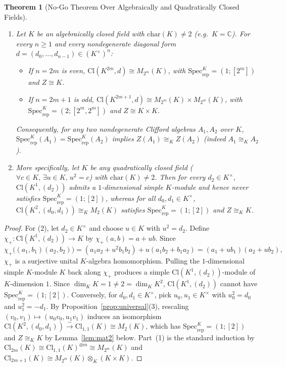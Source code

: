 \documentclass[11pt,a4paper]{article}
\theoremstyle{plain}
\newtheorem{theorem}{Theorem}[section]
\theoremstyle{definition}
\newcommand{\Cl}{\mathrm{Cl}}
\newcommand{\Specrep}{\mathrm{Spec}_{\mathrm{rep}}}
\newcommand{\Mat}{M}
\newcommand{\C}{\mathbb{C}}
\begin{document}
\begin{theorem}[No-Go Theorem Over Algebraically and Quadratically Closed Fields]\label{thm:obstruction}
\leavevmode
\begin{enumerate}
  \item Let $K$ be an algebraically closed field with $\mathrm{char}(K) \neq 2$ (e.g.\ $K = \C$). For every $n \ge 1$ and every nondegenerate diagonal form $d = (d_0,\dots,d_{n-1}) \in (K^\times)^n$:
  \begin{itemize}
    \item If $n = 2m$ is even, $\Cl(K^{2m}, d) \cong \Mat_{2^m}(K)$, with $\Specrep^K = (1;[2^m])$ and $Z \cong K$.
    \item If $n = 2m+1$ is odd, $\Cl(K^{2m+1}, d) \cong \Mat_{2^m}(K) \times \Mat_{2^m}(K)$, with $\Specrep^K = (2;[2^m, 2^m])$ and $Z \cong K \times K$.
  \end{itemize}
  Consequently, for any two nondegenerate Clifford algebras $A_1, A_2$ over $K$, $\Specrep^K(A_1) = \Specrep^K(A_2)$ implies $Z(A_1) \cong_K Z(A_2)$ (indeed $A_1 \cong_K A_2$).
  \item More specifically, let $K$ be \emph{any} quadratically closed field ($\forall c \in K,\, \exists u \in K,\, u^2 = c$) with $\mathrm{char}(K) \neq 2$. Then for every $d_2 \in K^\times$, $\Cl(K^1, (d_2))$ admits a $1$-dimensional simple $K$-module and hence \emph{never} satisfies $\Specrep^K = (1;[2])$, whereas for all $d_0, d_1 \in K^\times$, $\Cl(K^2, (d_0, d_1)) \cong_K \Mat_2(K)$ satisfies $\Specrep^K = (1;[2])$ and $Z \cong_K K$.
\end{enumerate}
\end{theorem}

\begin{proof}
For (2), let $d_2 \in K^\times$ and choose $u \in K$ with $u^2 = d_2$. Define $\chi_+ : \Cl(K^1, (d_2)) \to K$ by $\chi_+(a,b) = a + u b$. Since
\[
  \chi_+\bigl((a_1,b_1)(a_2,b_2)\bigr)
  = (a_1 a_2 + u^2 b_1 b_2) + u(a_1 b_2 + b_1 a_2)
  = (a_1 + u b_1)(a_2 + u b_2),
\]
$\chi_+$ is a surjective unital $K$-algebra homomorphism. Pulling the $1$-dimensional simple $K$-module $K$ back along $\chi_+$ produces a simple $\Cl(K^1, (d_2))$-module of $K$-dimension $1$. Since $\dim_K K = 1 \neq 2 = \dim_K K^2$, $\Cl(K^1,(d_2))$ cannot have $\Specrep^K = (1;[2])$. Conversely, for $d_0, d_1 \in K^\times$, pick $u_0, u_1 \in K^\times$ with $u_0^2 = d_0$ and $u_1^2 = -d_1$. By Proposition~\ref{prop:universal}(3), rescaling $(v_0, v_1) \mapsto (u_0 v_0, u_1 v_1)$ induces an isomorphism $\Cl(K^2,(d_0,d_1)) \xrightarrow{\sim} \Cl_{1,1}(K) \cong \Mat_2(K)$, which has $\Specrep^K = (1;[2])$ and $Z \cong_K K$ by Lemma~\ref{lem:mat2} below. Part~(1) is the standard induction by $\Cl_{2m}(K) \cong \Cl_{1,1}(K)^{\otimes m} \cong \Mat_{2^m}(K)$ and $\Cl_{2m+1}(K) \cong \Mat_{2^m}(K) \otimes_K (K \times K)$.
\end{proof}
\end{document}
